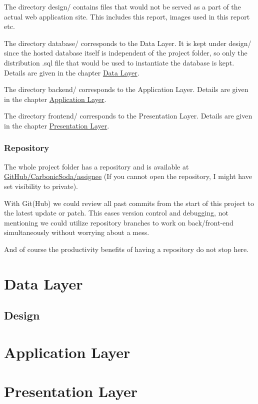 \documentclass[12pt]{report}
\newcommand{\n}{\par}
\newcommand{\br}{\vspace{1 em}\n}
\begin{document}
The directory design/ contains files that would not be served as a part of the actual web application site.
This includes this report, images used in this report etc.
\br
The directory database/ corresponds to the Data Layer. It is kept under design/ since the hosted database itself is independent of the project folder, so only the distribution .sql file that would be used to instantiate the database is kept.
Details are given in the chapter \hyperref[data-layer]{Data Layer}.
\br
The directory backend/ corresponds to the Application Layer.
Details are given in the chapter \hyperref[application-layer]{Application Layer}.
\br
The directory frontend/ corresponds to the Presentation Layer.
Details are given in the chapter \hyperref[presentation-layer]{Presentation Layer}.

\subsection{Repository}\label{overview.project-structure.repository}
The whole project folder has a repository and is available at
\href{https://github.com/CarbonicSoda/assignee}{GitHub/Carbonic\-Soda/assignee}
(If you cannot open the repository, I might have set visibility to private).
\br
With Git(Hub) we could review all past commits from the start of this project to the latest update or patch.
This eases version control and debugging,
not mentioning we could utilize repository branches to work on back/front-end simultaneously without worrying about a mess.
\br
And of course the productivity benefits of having a repository do not stop here.

\chapter{Data Layer}\label{data-layer}

\section{Design}\label{data-layer.design}


\chapter{Application Layer}\label{application-layer}

\chapter{Presentation Layer}\label{presentation-layer}
\end{document}
